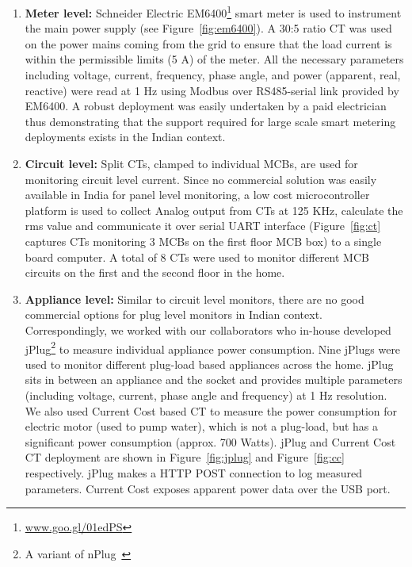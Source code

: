 \documentclass[10pt]{sensys-proc}
\newcommand{\figref}[1]{Figure~\ref{#1}}
\newcommand{\denselistbib}{
  \itemsep -.6pt\topsep-4pt\partopsep-20pt
}
\begin{document}
\begin{enumerate}\denselistbib
\item \textbf{Meter level:} Schneider Electric EM6400\footnote{\url{www.goo.gl/01edPS}} smart meter is used to instrument the main power supply (see \figref{fig:em6400}).%
A 30:5 ratio CT was used on the power mains coming from the grid to ensure that the load current is within the permissible limits (5 A) of the meter. All the necessary parameters including voltage, current, frequency, phase angle, and power (apparent, real, reactive) were read at 1 Hz using Modbus over RS485-serial link provided by EM6400. A robust deployment was easily undertaken by a paid electrician thus demonstrating that the support required for large scale smart metering deployments exists in the Indian context. 

\item \textbf{Circuit level:} Split CTs, clamped to individual MCBs, are used for monitoring circuit level current. Since no commercial solution was easily available in India for panel level monitoring, a low cost microcontroller platform is used to collect Analog output from CTs at 125 KHz, calculate the rms value and communicate it over serial UART interface (\figref{fig:ct} captures CTs monitoring 3 MCBs on the first floor MCB box) to a single board computer. A total of 8 CTs were used to monitor different MCB circuits on the first and the second floor in the home.

\item \textbf{Appliance level:} Similar to circuit level monitors, there are no good commercial options for plug level monitors in Indian context. Correspondingly, we worked with our collaborators who in-house developed jPlug\footnote{A variant of nPlug~\cite{nplug}} to measure individual appliance power consumption. Nine jPlugs were used to monitor different plug-load based appliances across the home. jPlug sits in between an appliance and the socket and provides multiple parameters (including voltage, current, phase angle and frequency) at 1 Hz resolution. We also used Current Cost based CT to measure the power consumption for electric motor (used to pump water), which is not a plug-load, but has a significant power consumption (approx. 700 Watts). jPlug and Current Cost CT deployment are shown in \figref{fig:jplug} and \figref{fig:cc} respectively. jPlug makes a HTTP POST connection to log measured parameters. Current Cost exposes apparent power data over the USB port. 
\end{enumerate}
\end{document}
